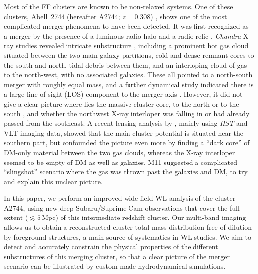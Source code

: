\documentclass[iop,twocolumn]{emulateapj}
\begin{document}
Most of the FF clusters are known to be non-relaxed systems. One of these clusters,  Abell~2744 (hereafter A2744; $z=0.308$) \citep{Lotz2013}, shows one of the most complicated merger phenomena to have been detected. It was first recognized as a merger by the presence of a luminous radio halo and a radio relic \citep{Giovannini1999,Govoni2001,Govoni2001a}. {\it Chandra} X-ray studies  revealed intricate substructure \citep{Kempner2004,Owers2011}, including a prominent hot gas cloud situated between the two main galaxy partitions,  cold and dense remnant cores to the south and north, tidal debris between them, and an interloping cloud of gas to the north-west, with no associated galaxies. These all pointed to a north-south merger with roughly equal mass, and a further dynamical study indicated there is a large line-of-sight (LOS) component to the merger axis \citep{Boschin2006}. However, it did not give a clear picture where lies the massive cluster core, to the north \citep{Owers2011} or to the south \citep{Kempner2004}, and whether the northwest X-ray interloper was falling in or had already passed from the southeast.
A recent lensing analysis by \citep[][hereafter M11]{Merten11}, mainly using {\it HST} and VLT imaging data, showed that the main cluster potential is situated near the southern part, but confounded the picture even more by finding 
a ``dark core'' of DM-only material between the two gas clouds, whereas the X-ray interloper seemed to be empty of DM as well as galaxies. M11 suggested a complicated ``slingshot'' scenario where the gas was thrown past the galaxies and DM, to try and explain this unclear picture.

In this paper, we perform an improved wide-field WL analysis of the cluster A2744, using new deep Subaru/Suprime-Cam observations that cover the full extent ($\lesssim5$\,Mpc) of this intermediate redshift cluster. Our multi-band imaging allows us to obtain a reconstructed cluster total mass distribution free of dilution by foreground structures, a main source of systematics in WL studies. We aim to detect and accurately constrain the physical properties of the different substructures of this merging cluster, so that a clear picture of the merger scenario can be illustrated by custom-made hydrodynamical simulations. 
\end{document}

